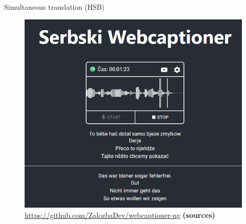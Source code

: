  \begin{block}{Simultaneous translation (HSB)}


    \begin{figure}
        \centering
        \includegraphics[width=0.7\colwidth]{03_z_01_webcaptioner_klein.png}
        \caption{\url{https://github.com/ZalozbaDev/webcaptioner-ng} \textbf{(sources)}}
        \label{fig:webcaptioner}
    \end{figure}

  \end{block}
